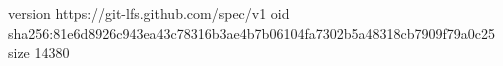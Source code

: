 version https://git-lfs.github.com/spec/v1
oid sha256:81e6d8926c943ea43c78316b3ae4b7b06104fa7302b5a48318cb7909f79a0c25
size 14380
